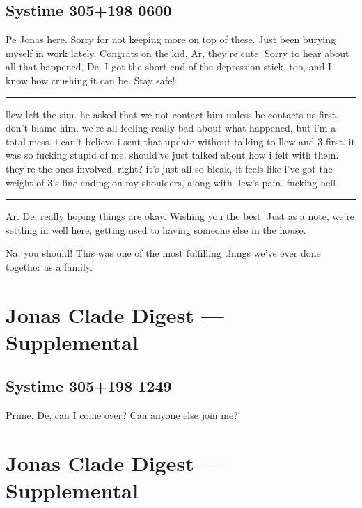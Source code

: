 \hypertarget{systime-305198-0600}{%
\subsection*{Systime 305+198 0600}\label{systime-305198-0600}}

Pe Jonas here. Sorry for not keeping more on top of these. Just been burying myself in work lately. Congrats on the kid, Ar, they're cute. Sorry to hear about all that happened, De. I got the short end of the depression stick, too, and I know how crushing it can be. Stay safe!

\begin{center}\rule{0.5\linewidth}{\linethickness}\end{center}

llew left the sim. he asked that we not contact him unless he contacts us first. don't blame him. we're all feeling really bad about what happened, but i'm a total mess. i can't believe i sent that update without talking to llew and 3 first. it was so fucking stupid of me, should've just talked about how i felt with them. they're the ones involved, right? it's just all so bleak, it feels like i've got the weight of 3's line ending on my shoulders, along with llew's pain. fucking hell

\begin{center}\rule{0.5\linewidth}{\linethickness}\end{center}

Ar. De, really hoping things are okay. Wishing you the best. Just as a note, we're settling in well here, getting used to having someone else in the house.

Na, you should! This was one of the most fulfilling things we've ever done together as a family.

\newpage
\hypertarget{jonas-clade-digest-supplemental-6}{%
\section*{Jonas Clade Digest --- Supplemental}\label{jonas-clade-digest-supplemental-6}}

\hypertarget{systime-305198-1249}{%
\subsection*{Systime 305+198 1249}\label{systime-305198-1249}}

Prime. De, can I come over? Can anyone else join me?

\newpage
\hypertarget{jonas-clade-digest-supplemental-7}{%
\section*{Jonas Clade Digest --- Supplemental}\label{jonas-clade-digest-supplemental-7}}

